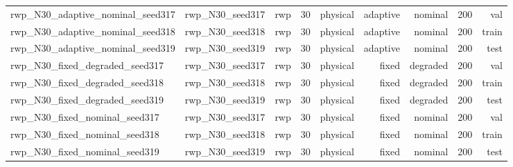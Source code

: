 \begin{tabular}{lrrrrrrrr}
rwp\_N30\_adaptive\_nominal\_seed317 & rwp\_N30\_seed317 & rwp & 30 & physical & adaptive & nominal & 200 & val \\
rwp\_N30\_adaptive\_nominal\_seed318 & rwp\_N30\_seed318 & rwp & 30 & physical & adaptive & nominal & 200 & train \\
rwp\_N30\_adaptive\_nominal\_seed319 & rwp\_N30\_seed319 & rwp & 30 & physical & adaptive & nominal & 200 & test \\
rwp\_N30\_fixed\_degraded\_seed317 & rwp\_N30\_seed317 & rwp & 30 & physical & fixed & degraded & 200 & val \\
rwp\_N30\_fixed\_degraded\_seed318 & rwp\_N30\_seed318 & rwp & 30 & physical & fixed & degraded & 200 & train \\
rwp\_N30\_fixed\_degraded\_seed319 & rwp\_N30\_seed319 & rwp & 30 & physical & fixed & degraded & 200 & test \\
rwp\_N30\_fixed\_nominal\_seed317 & rwp\_N30\_seed317 & rwp & 30 & physical & fixed & nominal & 200 & val \\
rwp\_N30\_fixed\_nominal\_seed318 & rwp\_N30\_seed318 & rwp & 30 & physical & fixed & nominal & 200 & train \\
rwp\_N30\_fixed\_nominal\_seed319 & rwp\_N30\_seed319 & rwp & 30 & physical & fixed & nominal & 200 & test \\
\bottomrule
\end{tabular}